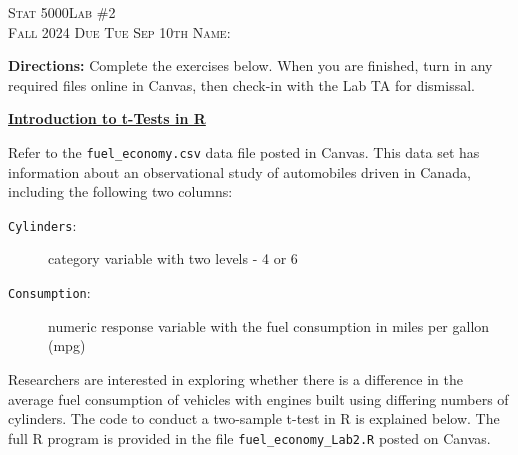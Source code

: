 \documentclass[11pt]{article}
\begin{document}
\large \noindent \textsc{Stat 5000}\hfill \large{\textsc{Lab \#2}} \hfill {} \\
\large \textsc{Fall 2024}  \hfill \textsc{Due Tue Sep 10th} \hfill \textsc{Name:} \underline{\hspace{2in}}

\vspace{14pt}

\noindent \textbf{Directions:} Complete the exercises below. When you are finished, turn in any required files online in Canvas, then check-in with the Lab TA for dismissal.
\\ \underline{\hspace{7in}}
\vspace{14pt}

\textbf{\underline{Introduction to t-Tests in R}}

Refer to the \texttt{fuel\_economy.csv} data file posted in Canvas. This data set has information about an observational study of automobiles driven in Canada, including the following two columns: 
\begin{description}
	\item [\texttt{Cylinders}:] category variable with two levels - 4 or 6
	\item [\texttt{Consumption}:] numeric response variable with the fuel consumption in miles per gallon (mpg)
\end{description}
Researchers are interested in exploring whether there is a difference in the average fuel consumption of vehicles with engines built using differing numbers of cylinders. The code to conduct a two-sample t-test in R is explained below. The full R program is provided in the file \texttt{fuel\_economy\_Lab2.R} posted on Canvas.
\end{document}
